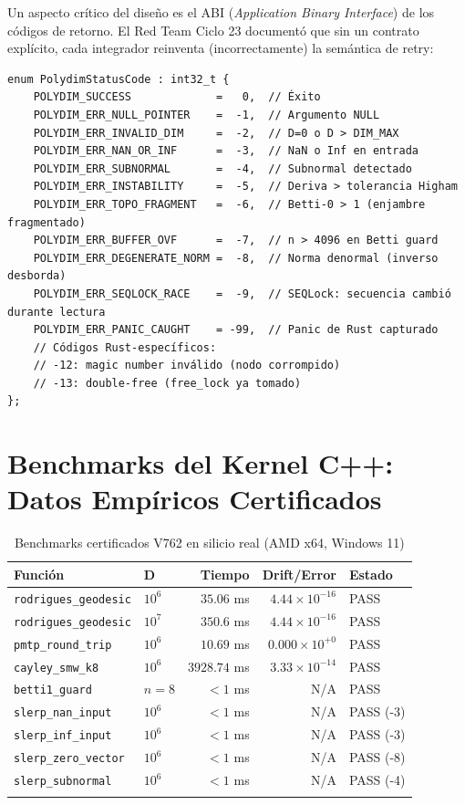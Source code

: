 Un aspecto crítico del diseño es el ABI (\textit{Application Binary Interface}) de
los códigos de retorno. El Red Team Ciclo 23 documentó que sin un contrato explícito,
cada integrador reinventa (incorrectamente) la semántica de retry:

\begin{lstlisting}[style=cppstyle, caption={Taxonomía completa de códigos de retorno POLYDIM}, label=lst:return_codes]
enum PolydimStatusCode : int32_t {
    POLYDIM_SUCCESS             =   0,  // Éxito
    POLYDIM_ERR_NULL_POINTER    =  -1,  // Argumento NULL
    POLYDIM_ERR_INVALID_DIM     =  -2,  // D=0 o D > DIM_MAX
    POLYDIM_ERR_NAN_OR_INF      =  -3,  // NaN o Inf en entrada
    POLYDIM_ERR_SUBNORMAL       =  -4,  // Subnormal detectado
    POLYDIM_ERR_INSTABILITY     =  -5,  // Deriva > tolerancia Higham
    POLYDIM_ERR_TOPO_FRAGMENT   =  -6,  // Betti-0 > 1 (enjambre fragmentado)
    POLYDIM_ERR_BUFFER_OVF      =  -7,  // n > 4096 en Betti guard
    POLYDIM_ERR_DEGENERATE_NORM =  -8,  // Norma denormal (inverso desborda)
    POLYDIM_ERR_SEQLOCK_RACE    =  -9,  // SEQLock: secuencia cambió durante lectura
    POLYDIM_ERR_PANIC_CAUGHT    = -99,  // Panic de Rust capturado
    // Códigos Rust-específicos:
    // -12: magic number inválido (nodo corrompido)
    // -13: double-free (free_lock ya tomado)
};
\end{lstlisting}

\section{Benchmarks del Kernel C++: Datos Empíricos Certificados}

\begin{longtable}{llrrl}
\toprule
\textbf{Función} & \textbf{D} & \textbf{Tiempo} & \textbf{Drift/Error} & \textbf{Estado} \\
\midrule
\texttt{rodrigues\_geodesic} & $10^6$ & $35.06$ ms & $4.44 \times 10^{-16}$ & \textcolor{polydimgreen}{PASS} \\
\texttt{rodrigues\_geodesic} & $10^7$ & $350.6$ ms & $4.44 \times 10^{-16}$ & \textcolor{polydimgreen}{PASS} \\
\texttt{pmtp\_round\_trip} & $10^6$ & $10.69$ ms & $0.000 \times 10^{+0}$ & \textcolor{polydimgreen}{PASS} \\
\texttt{cayley\_smw\_k8} & $10^6$ & $3928.74$ ms & $3.33 \times 10^{-14}$ & \textcolor{polydimgreen}{PASS} \\
\texttt{betti1\_guard} & $n=8$ & $< 1$ ms & N/A & \textcolor{polydimgreen}{PASS} \\
\texttt{slerp\_nan\_input} & $10^6$ & $< 1$ ms & N/A & \textcolor{polydimgreen}{PASS (-3)} \\
\texttt{slerp\_inf\_input} & $10^6$ & $< 1$ ms & N/A & \textcolor{polydimgreen}{PASS (-3)} \\
\texttt{slerp\_zero\_vector} & $10^6$ & $< 1$ ms & N/A & \textcolor{polydimgreen}{PASS (-8)} \\
\texttt{slerp\_subnormal} & $10^6$ & $< 1$ ms & N/A & \textcolor{polydimgreen}{PASS (-4)} \\
\bottomrule
\caption{Benchmarks certificados V762 en silicio real (AMD x64, Windows 11)}
\label{tab:benchmarks}
\end{longtable}

